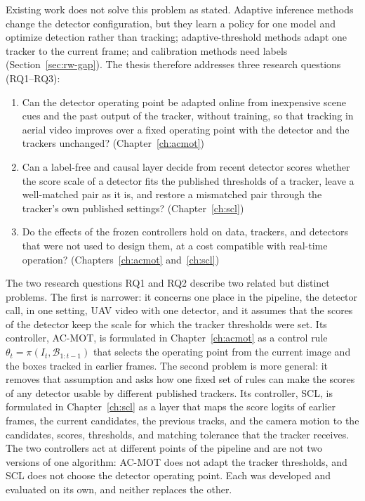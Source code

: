 Existing work does not solve this problem as stated. Adaptive inference methods change the detector configuration, but they learn a policy for one model and optimize detection rather than tracking; adaptive-threshold methods adapt one tracker to the current frame; and calibration methods need labels (Section~\ref{sec:rw-gap}). The thesis therefore addresses three research questions (RQ1--RQ3):
\begin{enumerate}
\item[\textbf{RQ1}] Can the detector operating point be adapted online from inexpensive scene cues and the past output of the tracker, without training, so that tracking in aerial video improves over a fixed operating point with the detector and the trackers unchanged? (Chapter~\ref{ch:acmot})
\item[\textbf{RQ2}] Can a label-free and causal layer decide from recent detector scores whether the score scale of a detector fits the published thresholds of a tracker, leave a well-matched pair as it is, and restore a mismatched pair through the tracker's own published settings? (Chapter~\ref{ch:scl})
\item[\textbf{RQ3}] Do the effects of the frozen controllers hold on data, trackers, and detectors that were not used to design them, at a cost compatible with real-time operation? (Chapters~\ref{ch:acmot} and~\ref{ch:scl})
\end{enumerate}

The two research questions RQ1 and RQ2 describe two related but distinct problems. The first is narrower: it concerns one place in the pipeline, the detector call, in one setting, UAV video with one detector, and it assumes that the scores of the detector keep the scale for which the tracker thresholds were set. Its controller, AC-MOT, is formulated in Chapter~\ref{ch:acmot} as a control rule $\theta_t=\pi(I_t,\mathcal{B}_{1:t-1})$ that selects the operating point from the current image and the boxes tracked in earlier frames. The second problem is more general: it removes that assumption and asks how one fixed set of rules can make the scores of any detector usable by different published trackers. Its controller, SCL, is formulated in Chapter~\ref{ch:scl} as a layer that maps the score logits of earlier frames, the current candidates, the previous tracks, and the camera motion to the candidates, scores, thresholds, and matching tolerance that the tracker receives. The two controllers act at different points of the pipeline and are not two versions of one algorithm: AC-MOT does not adapt the tracker thresholds, and SCL does not choose the detector operating point. Each was developed and evaluated on its own, and neither replaces the other.

